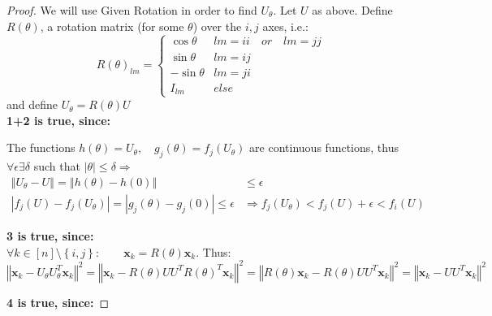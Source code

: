 \documentclass{article}
\newcommand{\x}{{\mathbf x}}
\begin{document}
\begin{proof}
We will use Given Rotation in order to find $U_\theta$. Let $U$ as above. Define $R(\theta)$, a rotation matrix (for some $\theta$) over the $i,j$ axes, i.e.:
$$
R(\theta)_{lm}=\begin{cases}
\cos\theta & lm=ii\quad or\quad lm=jj\\
\sin\theta & lm=ij\\
-\sin\theta & lm=ji\\
I_{lm} & else
\end{cases}
$$
and define $U_{\theta}=R(\theta)U$\\

\textbf{1+2 is true, since:} 

The functions $h\left(\theta\right)=U_{\theta},\quad g_j(\theta)=f_j(U_{\theta})$ are continuous functions, thus $\forall\epsilon\exists\delta$ such that $|\theta| \le\delta\Rightarrow$ 
\begin{align*}
  \left\Vert U_{\theta}- U\right\Vert = \left\Vert h(\theta)-h(0)\right\Vert& \le\epsilon  \\
  \left|f_j(U)- f_j(U_{\theta})\right|=\left|g_j(\theta)-g_j(0)\right|\le\epsilon&\Rightarrow f_j(U_{\theta})<f_j(U) + \epsilon < f_i(U)
\end{align*}


\textbf{3 is true, since:} \\
$\forall k\in[n]\setminus\left\{ i,j\right\} :\qquad \x_k=R(\theta)\x_k$. Thus:
$$
\left\Vert \x_{k}-U_{\theta}U_{\theta}^{T}\x_{k}\right\Vert^{2}=\left\Vert\x_{k}-R(\theta)UU^{T}R(\theta)^{T}\x_{k}\right\Vert^{2}=\left\Vert R(\theta)\x_{k}-R(\theta)UU^{T}\x_{k}\right\Vert^{2}=\left\Vert\x_{k}-UU^{T}\x_{k}\right\Vert^{2}
$$

\textbf{4 is true, since:} 


\end{proof}
\end{document}
